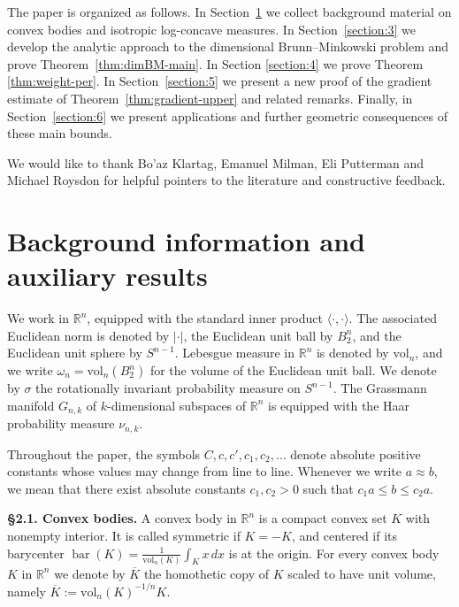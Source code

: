 \documentclass[11pt,leqno]{article}
\theoremstyle{definition}
\theoremstyle{remark}
\numberwithin{equation}{section}
\newcommand{\ls}{\leqslant}
\newcommand{\1}{\textbf{1}}
\newcommand{\vol}{\mathrm{vol}}
\begin{document}
The paper is organized as follows. In Section~\ref{section:2} we collect background material on convex bodies and isotropic log-concave measures. In Section~\ref{section:3} we develop the analytic approach to the dimensional Brunn--Minkowski problem and prove Theorem~\ref{thm:dimBM-main}. In Section \ref{section:4} we prove Theorem \ref{thm:weight-per}. In Section~\ref{section:5} we present a new proof of the gradient estimate of Theorem~\ref{thm:gradient-upper} and related remarks. Finally, in Section~\ref{section:6} we present applications and further geometric consequences of these main bounds.


\medskip

 We would like to thank Bo'az Klartag, Emanuel Milman, Eli Putterman and Michael Roysdon for helpful pointers to the literature and constructive feedback.

\section{Background information and auxiliary results}\label{section:2}

We work in $\mathbb{R}^n$, equipped with the standard inner product $\langle \cdot, \cdot \rangle$.  
The associated Euclidean norm is denoted by $|\cdot|$, the Euclidean unit ball by $B_2^n$, and the Euclidean unit sphere by $S^{n-1}$.  
Lebesgue measure in $\mathbb{R}^n$ is denoted by $\vol_n$, and we write $\omega_n = \vol_n(B_2^n)$ for the volume of the Euclidean unit ball.
We denote by $\sigma$ the rotationally invariant probability measure on $S^{n-1}$. The Grassmann manifold $G_{n,k}$ of $k$-dimensional subspaces 
of ${\mathbb R}^n$ is equipped with the Haar probability measure $\nu_{n,k}$. 

Throughout the paper, the symbols $C, c, c', c_1, c_2, \ldots$ denote absolute positive constants whose values may change from line to line.  
Whenever we write $a \approx b$, we mean that there exist absolute constants $c_1, c_2 > 0$ such that $c_1 a \ls b \ls c_2 a$. 

\bigskip 

\noindent \textbf{\S 2.1. Convex bodies.} A convex body in $\mathbb{R}^n$ is a compact convex set $K$ with nonempty interior.  
It is called symmetric if $K = -K$, and centered if its barycenter $\operatorname{bar}(K) = \frac{1}{\vol_n(K)} \int_K x\,dx$ is at the origin. 
For every convex body $K$ in $\mathbb R^n$ we denote by $\overline{K}$ the homothetic copy of $K$ scaled to have unit volume,
namely $\overline{K}:=\vol_n(K)^{-1/n}K$.
\end{document}
